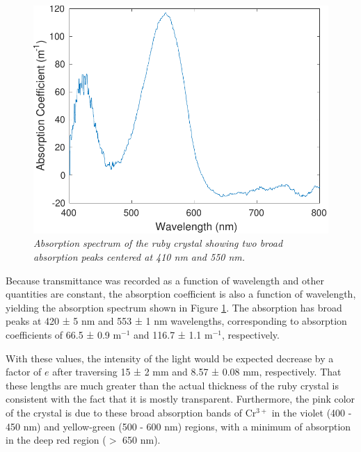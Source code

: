\documentclass[11pt, a4paper, twocolumn]{article}
\begin{document}
\begin{figure}[]
\includegraphics[width=\linewidth]{absorptionSpectrumFocused.pdf}
\caption{\textit{Absorption spectrum of the ruby crystal showing two broad absorption peaks centered at 410 nm and 550 nm.}}
\label{fig:absorptionSpectrumFocused}
\end{figure}



Because transmittance was recorded as a function of wavelength and other quantities are constant, the absorption coefficient is also a function of wavelength, yielding the absorption spectrum shown in Figure \ref{fig:absorptionSpectrumFocused}. The absorption has broad peaks at 420 ± 5 nm and 553 ± 1 nm wavelengths, corresponding to absorption coefficients of 66.5 ± 0.9 m$^{-1}$ and 116.7 ± 1.1 m$^{-1}$, respectively. 

With these values, the intensity of the light would be expected decrease by a factor of $e$ after traversing 15 ± 2 mm and 8.57 ± 0.08 mm, respectively. That these lengths are much greater than the actual thickness of the ruby crystal is consistent with the fact that it is mostly transparent. Furthermore, the pink color of the crystal is due to these broad absorption bands of Cr$^{3+}$ in the violet (400 - 450 nm) and yellow-green (500 - 600 nm) regions, with a minimum of absorption in the deep red region ($>$ 650 nm).
\end{document}
